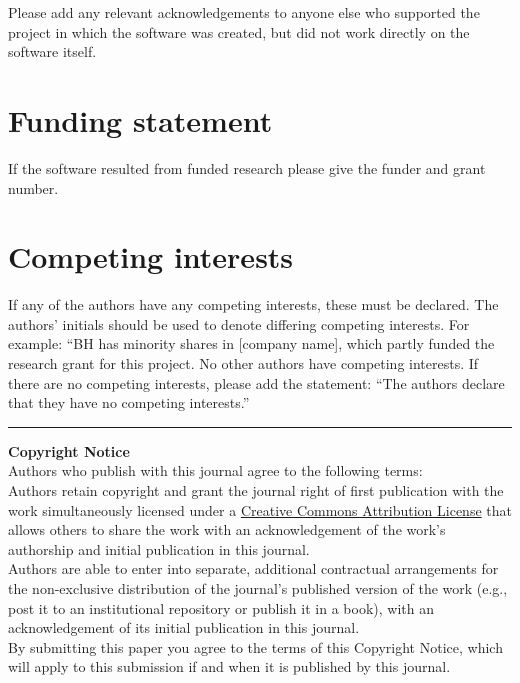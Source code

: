 \documentclass{jors}
\begin{document}
Please add any relevant acknowledgements to anyone else who supported the project in which the software was created, but did not work directly on the software itself.

\section*{Funding statement}

If the software resulted from funded research please give the funder and grant number.

\section*{Competing interests}

If any of the authors have any competing interests, these must be declared. The authors’ initials should be used to denote differing competing interests. For example: “BH has minority shares in [company name], which partly funded the research grant for this project. No other authors have competing interests. If there are no competing interests, please add the statement: “The authors declare that they have no competing interests.”




\vspace{2cm}

\rule{\textwidth}{1pt}

{ \bf Copyright Notice} \\
Authors who publish with this journal agree to the following terms: \\

Authors retain copyright and grant the journal right of first publication with the work simultaneously licensed under a \href{http://creativecommons.org/licenses/by/3.0/}{Creative Commons Attribution License} that allows others to share the work with an acknowledgement of the work's authorship and initial publication in this journal. \\

Authors are able to enter into separate, additional contractual arrangements for the non-exclusive distribution of the journal's published version of the work (e.g., post it to an institutional repository or publish it in a book), with an acknowledgement of its initial publication in this journal. \\

By submitting this paper you agree to the terms of this Copyright Notice, which will apply to this submission if and when it is published by this journal.
\end{document}
